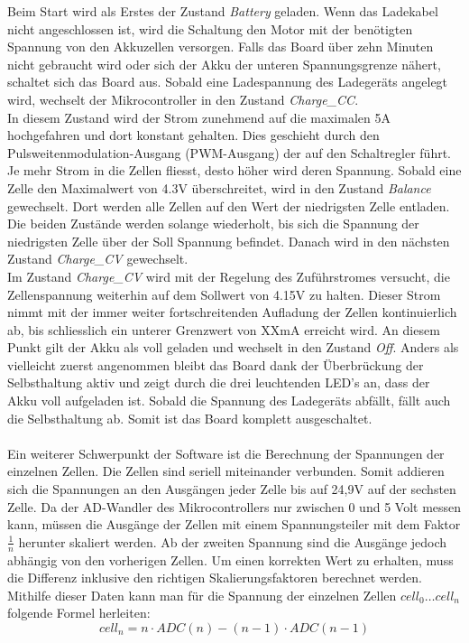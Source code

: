 Beim Start wird als Erstes der Zustand \textit{Battery} geladen. Wenn das Ladekabel nicht angeschlossen ist, wird die Schaltung den Motor mit der benötigten Spannung von den Akkuzellen versorgen. Falls das Board über zehn Minuten nicht gebraucht wird oder sich der Akku der unteren Spannungsgrenze nähert, schaltet sich das Board aus. Sobald eine Ladespannung des Ladegeräts angelegt wird, wechselt der Mikrocontroller in den Zustand \textit{Charge\_CC}.\\
In diesem Zustand wird der Strom zunehmend auf die maximalen 5A hochgefahren und dort konstant gehalten. Dies geschieht durch den Pulsweitenmodulation-Ausgang (PWM-Ausgang) der auf den Schaltregler führt. Je mehr Strom in die Zellen fliesst, desto höher wird deren Spannung. Sobald eine Zelle den Maximalwert von 4.3V überschreitet, wird in den Zustand \textit{Balance} gewechselt. Dort werden alle Zellen auf den Wert der niedrigsten Zelle entladen. Die beiden Zustände werden solange wiederholt, bis sich die  Spannung der niedrigsten Zelle über der Soll Spannung befindet.  Danach wird in den nächsten Zustand \textit{Charge\_CV} gewechselt. \\
Im Zustand \textit{Charge\_CV} wird mit der Regelung des Zuführstromes versucht, die Zellenspannung weiterhin auf dem Sollwert von 4.15V zu halten. Dieser Strom nimmt mit der immer weiter fortschreitenden Aufladung der Zellen kontinuierlich ab, bis schliesslich ein unterer Grenzwert von XXmA  erreicht wird. An diesem Punkt gilt der Akku als voll geladen und wechselt in den Zustand \textit{Off}.
Anders als vielleicht zuerst angenommen bleibt das Board dank der Überbrückung der Selbsthaltung aktiv und zeigt durch die drei leuchtenden LED’s an, dass der Akku voll aufgeladen ist. Sobald  die Spannung des Ladegeräts abfällt, fällt auch die Selbsthaltung ab. Somit ist das Board komplett ausgeschaltet.
\\\\
Ein weiterer Schwerpunkt der Software ist die Berechnung der Spannungen der einzelnen Zellen. Die Zellen sind seriell miteinander verbunden. Somit addieren sich die Spannungen an den Ausgängen jeder Zelle bis auf 24,9V auf der sechsten Zelle. Da der AD-Wandler des Mikrocontrollers nur zwischen 0 und 5 Volt messen kann, müssen die Ausgänge der Zellen mit einem Spannungsteiler mit dem Faktor \(\frac 1n\) herunter skaliert werden. Ab der zweiten Spannung sind die Ausgänge jedoch abhängig von den vorherigen Zellen. Um einen korrekten Wert zu erhalten, muss die Differenz inklusive den richtigen Skalierungsfaktoren berechnet werden. Mithilfe dieser Daten kann man für die Spannung der einzelnen Zellen \(cell_0 \dots cell_n\) folgende Formel herleiten:
\begin{equation}
	cell_n = n \cdot ADC(n) - (n-1)\cdot ADC(n-1)
	\label{eq:CellNSpannung}
\end{equation}

